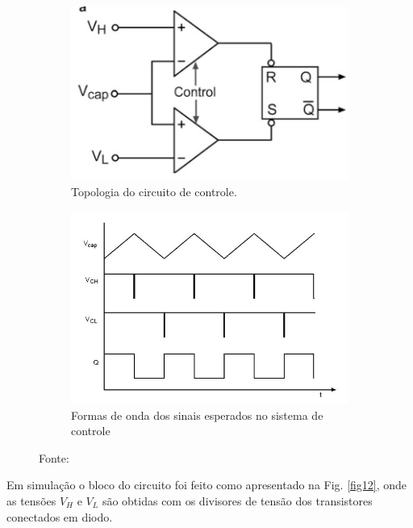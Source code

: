 \begin{figure}[htb]
     \centering
     \begin{subfigure}[b]{0.49\textwidth}
         \centering
         \includegraphics[width=\textwidth]{figuras/control_topology.png}
         \caption{Topologia do circuito de controle.}
         \label{fig10}
     \end{subfigure}
     \hfill
     \begin{subfigure}[b]{0.49\textwidth}
         \centering
         \includegraphics[width=\textwidth]{figuras/controle_waves.jpg}
         \caption{Formas de onda dos sinais esperados no sistema de controle}
         \label{fig11}
     \end{subfigure}
        \caption{Fonte:\cite{livroprincipal}}
        \label{fig:control}
\end{figure}

Em simulação o bloco do circuito foi feito como apresentado na Fig. \ref{fig12}, onde as tensões $V_H$ e $V_L$ são obtidas com os divisores de tensão dos transistores conectados em diodo.

